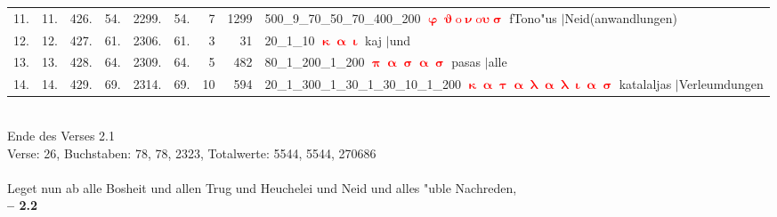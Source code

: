 \documentclass[a4paper,10pt,landscape]{article}
\begin{document}
\begin{tabular}{rrrrrrrrp{120mm}}
11.&11.&426.&54.&2299.&54.&7&1299&500\_9\_70\_50\_70\_400\_200 \textcolor{red}{$\boldsymbol{\upvarphi\upvartheta\mathrm{o}\upnu\mathrm{o}\upsilon\upsigma}$} fTono"us $|$Neid(anwandlungen)\\
12.&12.&427.&61.&2306.&61.&3&31&20\_1\_10 \textcolor{red}{$\boldsymbol{\upkappa\upalpha\upiota}$} kaj $|$und\\
13.&13.&428.&64.&2309.&64.&5&482&80\_1\_200\_1\_200 \textcolor{red}{$\boldsymbol{\uppi\upalpha\upsigma\upalpha\upsigma}$} pasas $|$alle\\
14.&14.&429.&69.&2314.&69.&10&594&20\_1\_300\_1\_30\_1\_30\_10\_1\_200 \textcolor{red}{$\boldsymbol{\upkappa\upalpha\uptau\upalpha\uplambda\upalpha\uplambda\upiota\upalpha\upsigma}$} katalaljas $|$Verleumdungen\\
\end{tabular}\medskip \\
Ende des Verses 2.1\\
Verse: 26, Buchstaben: 78, 78, 2323, Totalwerte: 5544, 5544, 270686\\
\\
Leget nun ab alle Bosheit und allen Trug und Heuchelei und Neid und alles "uble Nachreden,\\
\newpage 
{\bf -- 2.2}\\
\medskip \\
\end{document}

